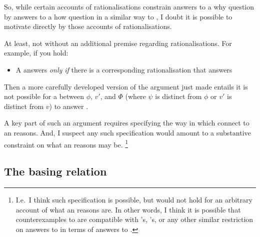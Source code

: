 \begin{note}
  So, while certain accounts of rationalisations constrain answers to a why question by answers to a how question in a similar way to \issueInclusion{}, I doubt it is possible to motivate \issueInclusion{} directly by those accounts of rationalisations.

  At least, not without an additional premise regarding rationalisations.
  For example, if you hold:
  \begin{itemize}
  \item
    A \ros{} answers \qWhy{} \emph{only if} there is a corresponding rationalisation that answers \qWhyR{}
  \end{itemize}
  Then a more carefully developed version of the argument just made entails it is not possible for a \ros{} between \(\phi\), \(v'\), and \(\Phi\) (where \(\psi\) is distinct from \(\phi\) or \(v'\) is distinct from \(v\)) to answer \qWhy{}.

  A key part of such an argument requires specifying the way in which \ros{} connect to an \agents{} reasons.
  And, I suspect any such specification would amount to a substantive constraint on what an \agents{} reasons may be.%
  \footnote{
    I.e.\ I think such specification is possible, but would not hold for an arbitrary account of what an \agents{} reasons are.
    In other words, I think it is possible that counterexamples to \issueInclusion{} are compatible with \citeauthor{Davidson:1963aa}'s, \citeauthor{Hieronymi:2011aa}'s, or any other similar restriction on answers to \qWhyR{} in terms of answers to \qHowR{}.
  }
\end{note}






\subsection*{The basing relation}

